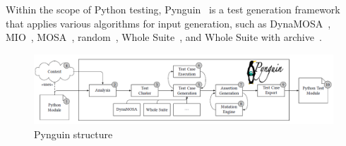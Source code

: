 \documentclass[%
  chapterprefix=false,%
  open=right,%
  twoside=true,%
  paper=a4,%
  logofile={Figures/logo.png},%
  thesistype=master,%
  UKenglish,%
]{se2thesis}
\begin{document}
Within the scope of Python testing, Pynguin~\cite{DBLP:conf/icse/LukasczykF22} is a test generation framework that applies various algorithms for input generation, such as DynaMOSA~\cite{DBLP:journals/tse/PanichellaKT18}, MIO~\cite{DBLP:conf/ssbse/Arcuri17}, MOSA~\cite{DBLP:conf/icst/PanichellaKT15}, random~\cite{DBLP:conf/icse/PachecoLEB07}, Whole Suite~\cite{DBLP:journals/tse/FraserA13}, and Whole Suite with archive~\cite{DBLP:journals/ese/RojasVAF17}.

\begin{figure}[tb]
  \centering
  \includegraphics[width=.99\textwidth]{Figures/pynguin.png}
  \caption{Pynguin structure}\label{fig:pyn}
\end{figure}
\end{document}

